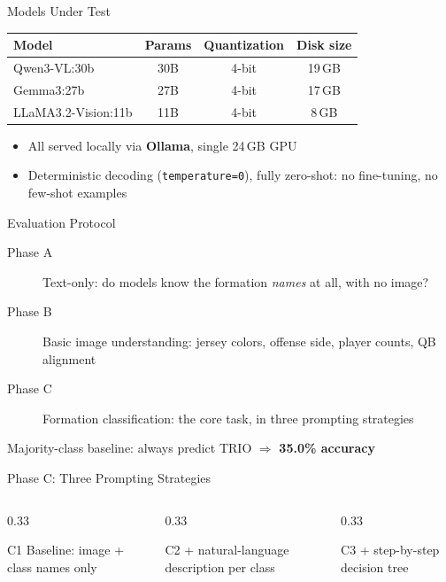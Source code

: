 \documentclass[9pt,aspectratio=169]{beamer}
\begin{document}
\begin{frame}{Models Under Test}
  \centering
  \renewcommand{\arraystretch}{1.3}
  \begin{tabular}{lccc}
    \toprule
    \textbf{Model} & \textbf{Params} & \textbf{Quantization} & \textbf{Disk size} \\
    \midrule
    Qwen3-VL:30b          & 30B & 4-bit & 19\,GB \\
    Gemma3:27b            & 27B & 4-bit & 17\,GB \\
    LLaMA3.2-Vision:11b   & 11B & 4-bit & 8\,GB \\
    \bottomrule
  \end{tabular}
  \vfill
  \begin{itemize}
    \item All served locally via \textbf{Ollama}, single 24\,GB GPU
    \item Deterministic decoding (\texttt{temperature=0}), fully zero-shot: no fine-tuning, no few-shot examples
  \end{itemize}
\end{frame}

\begin{frame}{Evaluation Protocol}
  \begin{description}
    \item[Phase A] Text-only: do models know the formation \emph{names} at all, with no image?
    \item[Phase B] Basic image understanding: jersey colors, offense side, player counts, QB alignment
    \item[Phase C] Formation classification: the core task, in three prompting strategies
  \end{description}
  \vfill
  {\small Majority-class baseline: always predict TRIO $\Rightarrow$ \textbf{35.0\% accuracy}}
\end{frame}

\begin{frame}{Phase C: Three Prompting Strategies}
  \centering
  \begin{columns}[T,onlytextwidth]
    \begin{column}{0.33\textwidth}
      \begin{block}{C1}
        \scriptsize Baseline: image + class names only
      \end{block}
    \end{column}
    \begin{column}{0.33\textwidth}
      \begin{block}{C2}
        \scriptsize + natural-language description per class
      \end{block}
    \end{column}
    \begin{column}{0.33\textwidth}
      \begin{block}{C3}
        \scriptsize + step-by-step decision tree
      \end{block}
    \end{column}
  \end{columns}
  \vfill
 
\end{frame}
\end{document}
